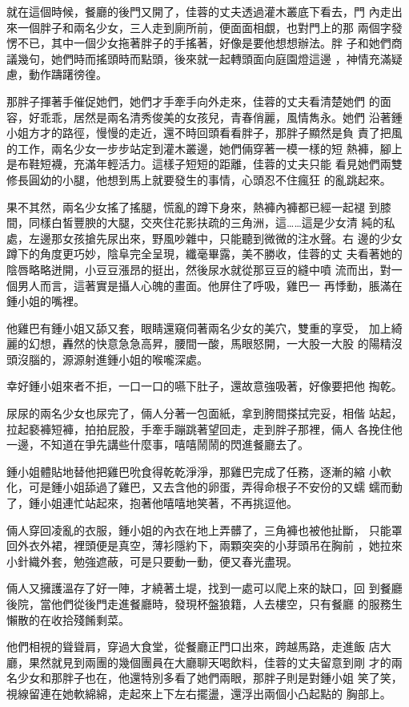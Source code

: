就在這個時候，餐廳的後門又開了，佳蓉的丈夫透過灌木叢底下看去，門
內走出來一個胖子和兩名少女，三人走到廁所前，便面面相覷，也對門上的那
兩個字發愣不已，其中一個少女拖著胖子的手搖著，好像是要他想想辦法。胖
子和她們商議幾句，她們時而搖頭時而點頭，後來就一起轉頭面向庭園燈這邊
，神情充滿疑慮，動作躊躇徬徨。

那胖子揮著手催促她們，她們才手牽手向外走來，佳蓉的丈夫看清楚她們
的面容，好乖乖，居然是兩名清秀俊美的女孩兒，青春俏麗，風情雋永。她們
沿著鍾小姐方才的路徑，慢慢的走近，還不時回頭看看胖子，那胖子顯然是負
責了把風的工作，兩名少女一步步站定到灌木叢邊，她們倆穿著一模一樣的短
熱褲，腳上是布鞋短襪，充滿年輕活力。這樣子短短的距離，佳蓉的丈夫只能
看見她們兩雙修長圓幼的小腿，他想到馬上就要發生的事情，心頭忍不住瘋狂
的亂跳起來。

果不其然，兩名少女搖了搖腿，慌亂的蹲下身來，熱褲內褲都已經一起褪
到膝間，同樣白皙豐腴的大腿，交夾住花影扶疏的三角洲，這……這是少女清
純的私處，左邊那女孩搶先尿出來，野風吵雜中，只能聽到微微的注水聲。右
邊的少女蹲下的角度更巧妙，陰阜完全呈現，纖毫畢露，美不勝收，佳蓉的丈
夫看著她的陰唇略略迸開，小豆豆漲昂的挺出，然後尿水就從那豆豆的縫中噴
流而出，對一個男人而言，這著實是攝人心魄的畫面。他屏住了呼吸，雞巴一
再悸動，脹滿在鍾小姐的嘴裡。

他雞巴有鍾小姐又舔又套，眼睛還窺伺著兩名少女的美穴，雙重的享受，
加上綺麗的幻想，轟然的快意急急高昇，腰間一酸，馬眼怒開，一大股一大股
的陽精沒頭沒腦的，源源射進鍾小姐的喉嚨深處。

幸好鍾小姐來者不拒，一口一口的嚥下肚子，還故意強吸著，好像要把他
掏乾。

尿尿的兩名少女也尿完了，倆人分著一包面紙，拿到胯間搽拭完妥，相偕
站起，拉起褻褲短褲，拍拍屁股，手牽手蹦跳著望回走，走到胖子那裡，倆人
各挽住他一邊，不知道在爭先講些什麼事，嘻嘻鬧鬧的閃進餐廳去了。

鍾小姐體貼地替他把雞巴吮食得乾乾淨淨，那雞巴完成了任務，逐漸的縮
小軟化，可是鍾小姐舔過了雞巴，又去含他的卵蛋，弄得命根子不安份的又蠕
蠕而動了，鍾小姐連忙站起來，抱著他嘻嘻地笑著，不再挑逗他。

倆人穿回凌亂的衣服，鍾小姐的內衣在地上弄髒了，三角褲也被他扯斷，
只能罩回外衣外裙，裡頭便是真空，薄衫隱約下，兩顆突突的小芽頭吊在胸前
，她拉來小針織外套，勉強遮蔽，可是只要動一動，便又春光盡現。

倆人又擁護溫存了好一陣，才繞著土堤，找到一處可以爬上來的缺口，回
到餐廳後院，當他們從後門走進餐廳時，發現杯盤狼籍，人去樓空，只有餐廳
的服務生懶散的在收拾殘餚剩菜。

他們相視的聳聳肩，穿過大食堂，從餐廳正門口出來，跨越馬路，走進飯
店大廳，果然就見到兩團的幾個團員在大廳聊天喝飲料，佳蓉的丈夫留意到剛
才的兩名少女和那胖子也在，他還特別多看了她們兩眼，那胖子則是對鍾小姐
笑了笑，視線留連在她軟綿綿，走起來上下左右擺盪，還浮出兩個小凸起點的
胸部上。

